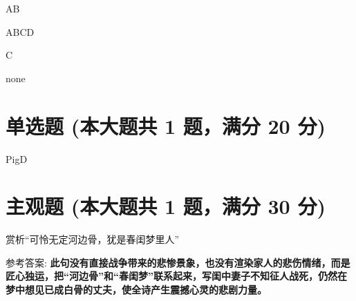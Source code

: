 \documentclass[12pt, a4paper, addpoints, answers]{exam}
\begin{document}
\begin{questions}
\question[5] AB

\begin{oneparcheckboxes}
\end{oneparcheckboxes}

\question[5] ABCD

\begin{oneparcheckboxes}
\end{oneparcheckboxes}

\question[5] C

\begin{oneparcheckboxes}
\end{oneparcheckboxes}

\question[5] none

\begin{oneparcheckboxes}
\end{oneparcheckboxes}

\end{questions}

\hspace{5cm}

\section{\normalsize{单选题 (本大题共 1 题，满分 20 分)}}
\hspace{1.5cm}

\begin{questions}
\question[20] PigD

\begin{oneparchoices}
\end{oneparchoices}

\end{questions}

\hspace{5cm}

\section{\normalsize{主观题 (本大题共 1 题，满分 30 分)}}
\hspace{1.5cm}

\begin{questions}
\question[30] 赏析“可怜无定河边骨，犹是春闺梦里人”

参考答案: \textbf{此句没有直接战争带来的悲惨景象，也没有渲染家人的悲伤情绪，而是匠心独运，把“河边骨”和“春闺梦”联系起来，写闺中妻子不知征人战死，仍然在梦中想见已成白骨的丈夫，使全诗产生震撼心灵的悲剧力量。}

\end{questions}
\end{document}

